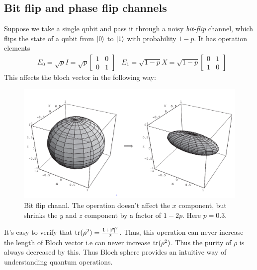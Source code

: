 \subsection{Bit flip and phase flip channels}
Suppose we take a single qubit and pass it through a noisy \textit{bit-flip} channel, which flips the state of a qubit from $\ket{0}$ to $\ket{1}$ with probability $1-p$. It has operation elements
\begin{align}
    &E_0 = \sqrt{p}I = \sqrt{p}\begin{bmatrix}
        1 & 0 \\ 0 & 1
    \end{bmatrix}
    &E_1 = \sqrt{1-p}X = \sqrt{1-p}\begin{bmatrix}
        0 & 1 \\ 1 & 0
    \end{bmatrix}
\end{align}
This affects the bloch vector in the following way:
\begin{figure}[H]
    \centering
    \includegraphics[width=\textwidth]{images/bit_flip_bloch.png}
    \caption{Bit flip channl. The operation doesn't affect the $x$ component, but shrinks the $y$ and $z$ component by a factor of $1-2p$. Here $p=0.3$.}
    \label{fig:bit_flip_bloch}
\end{figure}
It's easy to verify that $\text{tr}(\rho^2)=\frac{1+|\Vec{r}|^2}{2}$. Thus, this operation can never increase the length of Bloch vector i.e can never increase $\text{tr}(\rho^2)$. Thus the purity of $\rho$ is always decreased by this. Thus Bloch sphere provides an intuitive way of understanding quantum operations.   

